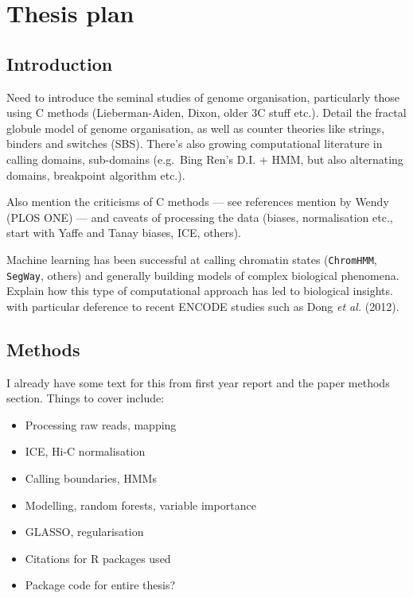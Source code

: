 \documentclass[a4paper,10pt,oneside]{book}
\begin{document}
\chapter{Thesis plan}

\section{Introduction}\label{introduction}

Need to introduce the seminal studies of genome organisation,
particularly those using C methods (Lieberman-Aiden, Dixon, older 3C
stuff etc.). Detail the fractal globule model of genome organisation, as
well as counter theories like strings, binders and switches (SBS).
There's also growing computational literature in calling domains,
sub-domains (e.g.~Bing Ren's D.I. + HMM, but also alternating domains,
breakpoint algorithm etc.).

Also mention the criticisms of C methods --- see references mention by
Wendy (PLOS ONE) --- and caveats of processing the data (biases,
normalisation etc., start with Yaffe and Tanay biases, ICE, others).

Machine learning has been successful at calling chromatin states
(\texttt{ChromHMM}, \texttt{SegWay}, others) and generally building
models of complex biological phenomena. Explain how this type of
computational approach has led to biological insights. with particular
deference to recent ENCODE studies such as Dong \emph{et al.} (2012).

\section{Methods}\label{methods}

I already have some text for this from first year report and the paper
methods section. Things to cover include:

\begin{itemize}
\itemsep1pt\parskip0pt
\item
  Processing raw reads, mapping
\item
  ICE, Hi-C normalisation
\item
  Calling boundaries, HMMs
\item
  Modelling, random forests, variable importance
\item
  GLASSO, regularisation
\item
  Citations for R packages used
\item
  Package code for entire thesis?
\end{itemize}
\end{document}
